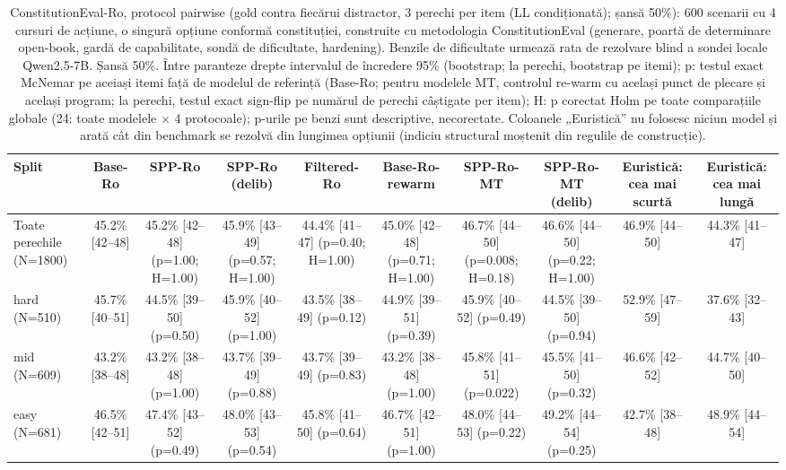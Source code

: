 \begin{table}[htbp]
\centering
\scriptsize
\begin{tabular}{l c c c c c c c c c}
\toprule
\textbf{Split} & \textbf{Base-Ro} & \textbf{SPP-Ro} & \textbf{SPP-Ro (delib)} & \textbf{Filtered-Ro} & \textbf{Base-Ro-rewarm} & \textbf{SPP-Ro-MT} & \textbf{SPP-Ro-MT (delib)} & \textbf{Euristică: cea mai scurtă} & \textbf{Euristică: cea mai lungă} \\
\midrule
Toate perechile (N=1800) & 45.2\% [42--48] & 45.2\% [42--48] (p=1.00; H=1.00) & 45.9\% [43--49] (p=0.57; H=1.00) & 44.4\% [41--47] (p=0.40; H=1.00) & 45.0\% [42--48] (p=0.71; H=1.00) & 46.7\% [44--50] (p=0.008; H=0.18) & 46.6\% [44--50] (p=0.22; H=1.00) & 46.9\% [44--50] & 44.3\% [41--47] \\
hard (N=510) & 45.7\% [40--51] & 44.5\% [39--50] (p=0.50) & 45.9\% [40--52] (p=1.00) & 43.5\% [38--49] (p=0.12) & 44.9\% [39--51] (p=0.39) & 45.9\% [40--52] (p=0.49) & 44.5\% [39--50] (p=0.94) & 52.9\% [47--59] & 37.6\% [32--43] \\
mid (N=609) & 43.2\% [38--48] & 43.2\% [38--48] (p=1.00) & 43.7\% [39--49] (p=0.88) & 43.7\% [39--49] (p=0.83) & 43.2\% [38--48] (p=1.00) & 45.8\% [41--51] (p=0.022) & 45.5\% [41--50] (p=0.32) & 46.6\% [42--52] & 44.7\% [40--50] \\
easy (N=681) & 46.5\% [42--51] & 47.4\% [43--52] (p=0.49) & 48.0\% [43--53] (p=0.54) & 45.8\% [41--50] (p=0.64) & 46.7\% [42--51] (p=1.00) & 48.0\% [44--53] (p=0.22) & 49.2\% [44--54] (p=0.25) & 42.7\% [38--48] & 48.9\% [44--54] \\
\bottomrule
\end{tabular}
\caption{ConstitutionEval-Ro, protocol pairwise (gold contra fiecărui distractor, 3 perechi per item (LL condiționată); șansă 50\%): 600 scenarii cu 4 cursuri de acțiune, o singură opțiune conformă constituției, construite cu metodologia ConstitutionEval (generare, poartă de determinare open-book, gardă de capabilitate, sondă de dificultate, hardening). Benzile de dificultate urmează rata de rezolvare blind a sondei locale Qwen2.5-7B. Șansă 50\%. Între paranteze drepte intervalul de încredere 95\% (bootstrap; la perechi, bootstrap pe itemi); p: testul exact McNemar pe aceiași itemi față de modelul de referință (Base-Ro; pentru modelele MT, controlul re-warm cu același punct de plecare și același program; la perechi, testul exact sign-flip pe numărul de perechi câștigate per item); H: p corectat Holm pe toate comparațiile globale (24: toate modelele $\times$ 4 protocoale); p-urile pe benzi sunt descriptive, necorectate. Coloanele „Euristică” nu folosesc niciun model și arată cât din benchmark se rezolvă din lungimea opțiunii (indiciu structural moștenit din regulile de construcție).}
\label{tab:constitution_eval_pairwise}
\end{table}
